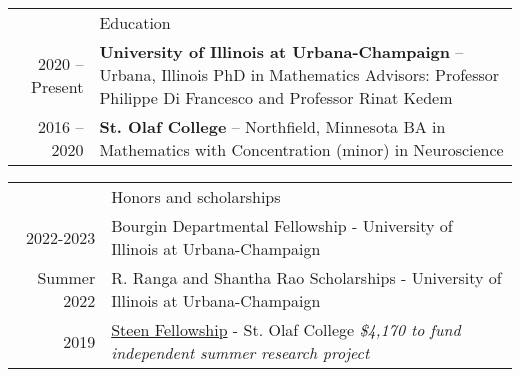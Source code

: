 \documentclass[letterpaper, 11pt]{article}
\newcommand{\headingfont}{\Large\color{Red}}
\newenvironment{SectionTable}[1]{
	\renewcommand*{\arraystretch}{1.7}
	\setlength{\tabcolsep}{10pt}
	\begin{longtable}{Rp{5.2in}} & #1 \\}
	{\end{longtable}\vspace{-.3cm}}
\newenvironment{SectionTableSingleSpace}[1]{
	\renewcommand*{\arraystretch}{1.2}
	\setlength{\tabcolsep}{10pt}
	\begin{longtable}{Rp{5.2in}} & #1 \\[0.6em]}
	{\end{longtable}\vspace{-.3cm}}
\begin{document}
	\begin{SectionTable}{\headingfont Education}
		2020 -- Present & 
		\textbf{University of Illinois at Urbana-Champaign} -- Urbana, Illinois \newline
		PhD in Mathematics \newline 
		Advisors: Professor Philippe Di Francesco and Professor Rinat Kedem %
		\\
		
		2016 -- 2020 & 
		\textbf{St. Olaf College} -- Northfield, Minnesota \newline
		BA in Mathematics with Concentration (minor) in Neuroscience \newline 
		\\
		
		
		
		
	\end{SectionTable}
	
	
	\begin{SectionTableSingleSpace}{\headingfont Honors and scholarships}
		2022-2023 &
		Bourgin Departmental Fellowship - University of Illinois at Urbana-Champaign\newline
		\\
		
		Summer 2022 &
		R. Ranga and Shantha Rao Scholarships - University of Illinois at Urbana-Champaign  \newline
		\\
		

		2019 &
		\href{https://wp.stolaf.edu/curi/summer-undergraduate-research}{Steen Fellowship} - St. Olaf College \newline 
		\textit{\$4,170  to fund independent summer research project}
		\\
		
		
	\end{SectionTableSingleSpace}
	
\end{document}
